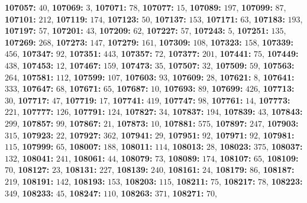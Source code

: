 \textsf{\bfseries 107057:} $40$, \textsf{\bfseries 107069:} $3$, \textsf{\bfseries 107071:} $78$, \textsf{\bfseries 107077:} $15$, \textsf{\bfseries 107089:} $197$, \textsf{\bfseries 107099:} $87$, \textsf{\bfseries 107101:} $212$, \textsf{\bfseries 107119:} $174$, \textsf{\bfseries 107123:} $50$, \textsf{\bfseries 107137:} $153$, \textsf{\bfseries 107171:} $63$, \textsf{\bfseries 107183:} $193$, \textsf{\bfseries 107197:} $57$, \textsf{\bfseries 107201:} $43$, \textsf{\bfseries 107209:} $62$, \textsf{\bfseries 107227:} $57$, \textsf{\bfseries 107243:} $5$, \textsf{\bfseries 107251:} $135$, \textsf{\bfseries 107269:} $268$, \textsf{\bfseries 107273:} $147$, \textsf{\bfseries 107279:} $161$, \textsf{\bfseries 107309:} $108$, \textsf{\bfseries 107323:} $158$, \textsf{\bfseries 107339:} $456$, \textsf{\bfseries 107347:} $92$, \textsf{\bfseries 107351:} $443$, \textsf{\bfseries 107357:} $72$, \textsf{\bfseries 107377:} $201$, \textsf{\bfseries 107441:} $75$, \textsf{\bfseries 107449:} $438$, \textsf{\bfseries 107453:} $12$, \textsf{\bfseries 107467:} $159$, \textsf{\bfseries 107473:} $35$, \textsf{\bfseries 107507:} $32$, \textsf{\bfseries 107509:} $59$, \textsf{\bfseries 107563:} $264$, \textsf{\bfseries 107581:} $112$, \textsf{\bfseries 107599:} $107$, \textsf{\bfseries 107603:} $93$, \textsf{\bfseries 107609:} $28$, \textsf{\bfseries 107621:} $8$, \textsf{\bfseries 107641:} $333$, \textsf{\bfseries 107647:} $68$, \textsf{\bfseries 107671:} $65$, \textsf{\bfseries 107687:} $10$, \textsf{\bfseries 107693:} $89$, \textsf{\bfseries 107699:} $426$, \textsf{\bfseries 107713:} $30$, \textsf{\bfseries 107717:} $47$, \textsf{\bfseries 107719:} $17$, \textsf{\bfseries 107741:} $419$, \textsf{\bfseries 107747:} $98$, \textsf{\bfseries 107761:} $14$, \textsf{\bfseries 107773:} $221$, \textsf{\bfseries 107777:} $126$, \textsf{\bfseries 107791:} $124$, \textsf{\bfseries 107827:} $34$, \textsf{\bfseries 107837:} $194$, \textsf{\bfseries 107839:} $43$, \textsf{\bfseries 107843:} $299$, \textsf{\bfseries 107857:} $99$, \textsf{\bfseries 107867:} $21$, \textsf{\bfseries 107873:} $10$, \textsf{\bfseries 107881:} $575$, \textsf{\bfseries 107897:} $247$, \textsf{\bfseries 107903:} $315$, \textsf{\bfseries 107923:} $22$, \textsf{\bfseries 107927:} $362$, \textsf{\bfseries 107941:} $29$, \textsf{\bfseries 107951:} $92$, \textsf{\bfseries 107971:} $92$, \textsf{\bfseries 107981:} $115$, \textsf{\bfseries 107999:} $65$, \textsf{\bfseries 108007:} $188$, \textsf{\bfseries 108011:} $114$, \textsf{\bfseries 108013:} $28$, \textsf{\bfseries 108023:} $375$, \textsf{\bfseries 108037:} $132$, \textsf{\bfseries 108041:} $241$, \textsf{\bfseries 108061:} $44$, \textsf{\bfseries 108079:} $73$, \textsf{\bfseries 108089:} $174$, \textsf{\bfseries 108107:} $65$, \textsf{\bfseries 108109:} $70$, \textsf{\bfseries 108127:} $23$, \textsf{\bfseries 108131:} $227$, \textsf{\bfseries 108139:} $240$, \textsf{\bfseries 108161:} $24$, \textsf{\bfseries 108179:} $86$, \textsf{\bfseries 108187:} $219$, \textsf{\bfseries 108191:} $142$, \textsf{\bfseries 108193:} $153$, \textsf{\bfseries 108203:} $115$, \textsf{\bfseries 108211:} $75$, \textsf{\bfseries 108217:} $78$, \textsf{\bfseries 108223:} $349$, \textsf{\bfseries 108233:} $45$, \textsf{\bfseries 108247:} $110$, \textsf{\bfseries 108263:} $371$, \textsf{\bfseries 108271:} $70$, 

